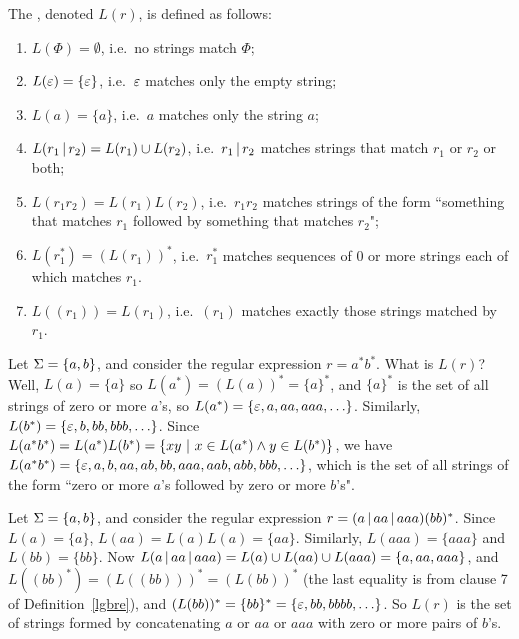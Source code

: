 \begin{definition}\label{lgbre}
The , 
denoted $L(r)$,
is defined as follows:
\begin{enumerate}
\item $L(\Phi) = \emptyset$, i.e.\ no strings match $\Phi$;
\item $L(\varepsilon) = \{\varepsilon\}$, i.e.\ $\varepsilon$ matches only the 
empty string;
\item $L(a) = \{a\}$, i.e.\ $a$ matches only the string $a$;
\item $L(r_1\hbox{$\,|\,$} r_2) = L(r_1) \cup L(r_2)$, i.e.\ $r_1\hbox{$\,|\,$} r_2$ matches
strings that match $r_1$ or $r_2$ or both;
\item $L(r_1r_2) = L(r_1)L(r_2)$, i.e.\ $r_1r_2$ matches strings of the form 
``something that matches $r_1$ followed by something that 
matches $r_2$";
\item $L(r_1^*) = (L(r_1))^*$, i.e.\ $r_1^*$ matches sequences of 0
or more strings each of which matches $r_1$.
\item $L((r_1)) = L(r_1)$, i.e.\ $(r_1)$ matches exactly those strings
matched by $r_1$.
\end{enumerate}
\end{definition}

\begin{example}
Let $\Sigma = \mbox{$\{a,b\}$}$, and consider the regular expression $r=a^*b^*$.  What is
$L(r)$?  Well, $L(a) = \{a\}$ so $L(a^*) = (L(a))^* = \{a\}^*$, and $\{a\}^*$ is
the set of all strings of zero or more $a$'s, so $L(a^*) = \{\varepsilon, a, aa, aaa,
\ldots\}$.  Similarly, $L(b^*) = \{\varepsilon, b, bb, bbb, \ldots\}$.  
Since  $L(a^*b^*) = L(a^*)L(b^*) = \{xy \ | \ x\in L(a^*)\wedge y\in L(b^*)\}$, we
have $L(a^*b^*) = \{\varepsilon, a, b, aa, ab, bb, aaa, aab, abb, bbb, \ldots\}$,
which is the set of all strings of the form ``zero or more $a$'s followed by zero
or more $b$'s".
\end{example}

\begin{example}
Let $\Sigma = \mbox{$\{a,b\}$}$, and consider the regular expression $r=(a\hbox{$\,|\,$} aa\hbox{$\,|\,$} aaa)(bb)^*$.
Since $L(a) = \{a\}$, $L(aa) = L(a)L(a) = \{aa\}$.  Similarly, $L(aaa) = \{aaa\}$
and $L(bb) = \{bb\}$.  Now $L(a\hbox{$\,|\,$} aa\hbox{$\,|\,$} aaa) = L(a) \cup L(aa) \cup L(aaa) = \{a, aa,
aaa\}$, and $L((bb)^*) = (L((bb)))^* = (L(bb))^*$  (the last equality is from
clause 7 of Definition~\ref{lgbre}), and $(L(bb))^* = \{bb\}^* = \{\varepsilon, bb,
bbbb, \ldots\}$.  So $L(r)$ is the set of strings formed by
concatenating $a$ or $aa$ or $aaa$ with zero or more pairs of $b$'s.
\end{example}

